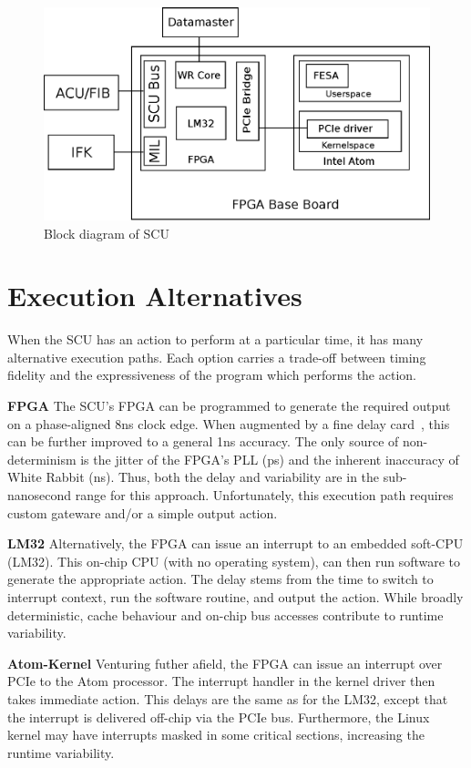 \documentclass{JAC2003}
\begin{document}
\begin{figure}[t]
   \centering
   \includegraphics*[width=\columnwidth]{scu_schema}
   \caption{Block diagram of SCU}
\end{figure}


\section{Execution Alternatives}
When the SCU has an action to perform at a particular time, 
it has many alternative execution paths.
Each option carries a trade-off between timing fidelity and 
the expressiveness of the program which performs the action.

\textbf{FPGA} 
The SCU's FPGA can be programmed to generate the required output
on a phase-aligned 8ns clock edge. 
When augmented by a fine delay card~\cite{cern-fine-delay},
this can be further improved to a general 1ns accuracy.
The only source of non-determinism is the jitter of the FPGA's PLL (ps) 
and the inherent inaccuracy of White Rabbit (ns).
Thus, both the delay and variability are in the sub-nanosecond range 
for this approach.
Unfortunately, this execution path requires custom gateware and/or
a simple output action.

\textbf{LM32} 
Alternatively, the FPGA can issue an interrupt to an embedded soft-CPU (LM32).
This on-chip CPU (with no operating system), 
can then run software to generate the appropriate action.
The delay stems from the time to switch to interrupt context,
run the software routine,
and output the action.
While broadly deterministic,
cache behaviour and on-chip bus accesses contribute to runtime variability.

\textbf{Atom-Kernel}
Venturing futher afield,
the FPGA can issue an interrupt over PCIe to the Atom processor.
The interrupt handler in the kernel driver then takes immediate action.
This delays are the same as for the LM32, 
except that the interrupt is delivered off-chip via the PCIe bus.
Furthermore, 
the Linux kernel may have interrupts masked in some critical sections,
increasing the runtime variability.
\end{document}
